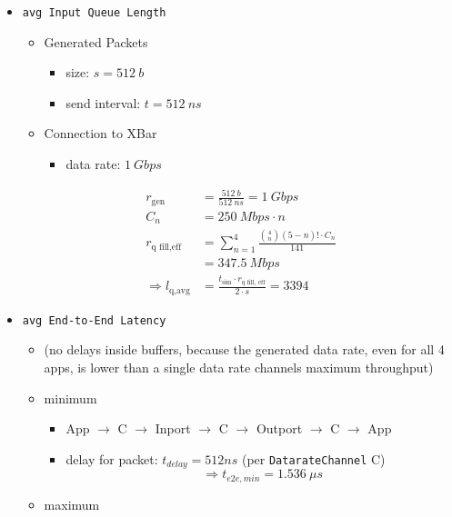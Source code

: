 \documentclass[]{scrartcl}
\begin{document}
    \begin{itemize}
        \item \verb|avg Input Queue Length|
            \begin{itemize}
                \item Generated Packets
                    \begin{itemize}
                        \item size: $ s = \SI{512}{b}$
                        \item send interval: $ t = \SI{512}{ns}$
                    \end{itemize}
                \item Connection to XBar
                    \begin{itemize}
                        \item data rate: $\SI{1}{Gbps}$
                    \end{itemize}
            \end{itemize}

        \begin{align}
            r_\text{gen} &= \frac{\SI{512}{b}}{\SI{512}{ns}} = \SI{1}{Gbps}\\
            C_n &= \SI{250}{Mbps}\cdot n\\
            r_\text{q fill,eff} &= \sum_{n=1}^4 \frac{\binom{4}{n}\left( 5-n \right)! \cdot C_n }{141}\\
                               &= \SI{347.5}{Mbps}\\
            \Rightarrow l_\text{q,avg} &= \frac{t_\text{sim}\cdot r_\text{q fill, eff}}{2\cdot s} = 3394
        \end{align}

        \item \verb|avg End-to-End Latency|
            \begin{itemize}
                \item (no delays inside buffers, because the generated data rate, even for all 4 apps, is lower than a single data rate channels maximum throughput)
                \item minimum
                    \begin{itemize}
                        \item App $\rightarrow$ C $\rightarrow$ Inport
                            $\rightarrow$ C $\rightarrow$ Outport $\rightarrow$ C $\rightarrow$ App
                        \item delay for packet: $t_{delay}=512ns$ (per \verb|DatarateChannel| C)
                            \begin{equation}
                                \Rightarrow t_{e2e,min} = \SI{1.536}{\mu s}
                            \end{equation}
                    \end{itemize}
                \item maximum


\end{itemize}
\end{itemize}
\end{document}
